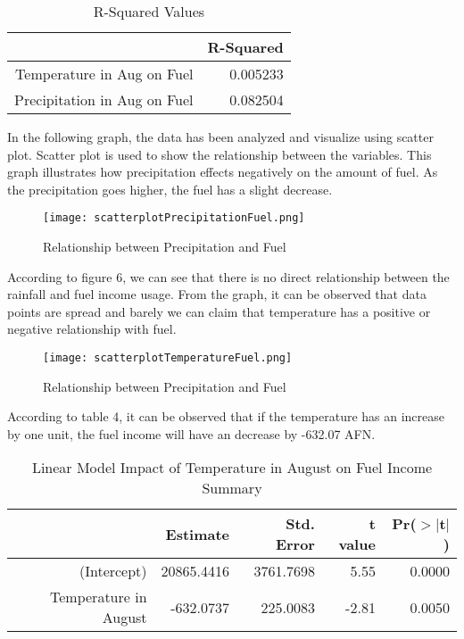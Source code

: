 \documentclass[12pt, a4]{article}
\begin{document}
\begin{table}[H]
\centering
\caption{\label{tab:table-name} R-Squared Values}
\begin{tabular}{rr}
  \hline
 & R-Squared \\ 
  \hline
Temperature in Aug on Fuel & 0.005233 \\ 
  Precipitation in Aug on Fuel & 0.082504 \\ 
   \hline
\end{tabular}


\end{table}

In the following graph, the data has been analyzed and visualize using scatter plot. Scatter plot is used to show the relationship between the variables. This graph illustrates how precipitation effects negatively on the amount of fuel. As the precipitation goes higher, the fuel has a slight decrease. 

\begin{figure}[H]
\centering
\texttt{[image: scatterplotPrecipitationFuel.png]}
\caption{Relationship between Precipitation and Fuel}
\end{figure}

According to figure 6, we can see that there is no direct relationship between the rainfall and fuel income usage. From the graph, it can be observed that data points are spread and barely we can claim that temperature has a positive or negative relationship with fuel.  

\begin{figure}[H]
\centering
\texttt{[image: scatterplotTemperatureFuel.png]}
\caption{Relationship between Precipitation and Fuel}
\end{figure}


According to table 4, it can be observed that if the temperature has an increase by one unit, the fuel income will have an decrease by -632.07 AFN.
\begin{table}[H]
\centering
\caption{ Linear Model Impact of Temperature in August on Fuel Income Summary }
\begin{tabular}{rrrrr}
  \hline
 & Estimate & Std. Error & t value & Pr($>$$|$t$|$)  \\
  \hline
(Intercept) & 20865.4416 & 3761.7698 & 5.55 & 0.0000 \\ 
  Temperature in August & -632.0737 & 225.0083 & -2.81 & 0.0050 \\ 
   \hline
\end{tabular}
\end{table}
\end{document}
